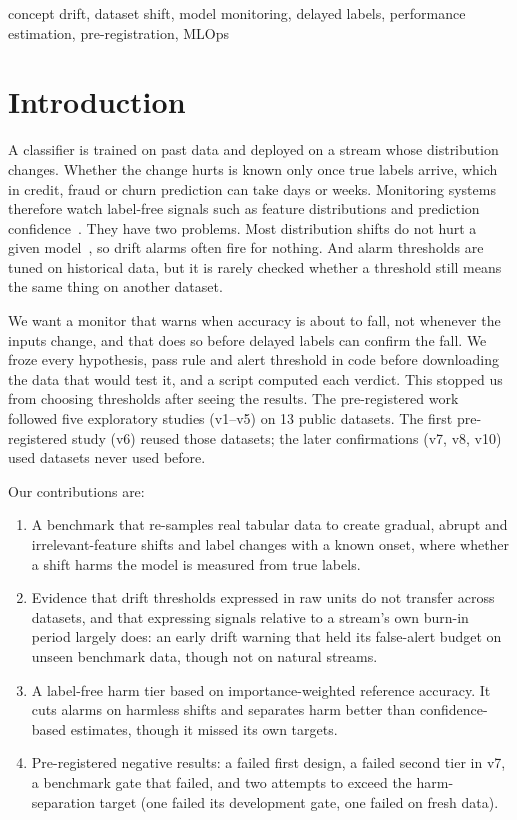 \documentclass[conference]{IEEEtran}
\begin{document}
\begin{IEEEkeywords}
concept drift, dataset shift, model monitoring, delayed labels, performance estimation, pre-registration, MLOps
\end{IEEEkeywords}

\section{Introduction}
A classifier is trained on past data and deployed on a stream whose distribution changes. Whether the change hurts is known only once true labels arrive, which in credit, fraud or churn prediction can take days or weeks. Monitoring systems therefore watch label-free signals such as feature distributions and prediction confidence~\cite{sculley2015debt,breck2017mltest}. They have two problems. Most distribution shifts do not hurt a given model~\cite{rabanser2019failing}, so drift alarms often fire for nothing. And alarm thresholds are tuned on historical data, but it is rarely checked whether a threshold still means the same thing on another dataset.

We want a monitor that warns when accuracy is about to fall, not whenever the inputs change, and that does so before delayed labels can confirm the fall. We froze every hypothesis, pass rule and alert threshold in code before downloading the data that would test it, and a script computed each verdict. This stopped us from choosing thresholds after seeing the results. The pre-registered work followed five exploratory studies (v1--v5) on 13 public datasets. The first pre-registered study (v6) reused those datasets; the later confirmations (v7, v8, v10) used datasets never used before.

Our contributions are:
\begin{enumerate}
\item A benchmark that re-samples real tabular data to create gradual, abrupt and irrelevant-feature shifts and label changes with a known onset, where whether a shift harms the model is measured from true labels.
\item Evidence that drift thresholds expressed in raw units do not transfer across datasets, and that expressing signals relative to a stream's own burn-in period largely does: an early drift warning that held its false-alert budget on unseen benchmark data, though not on natural streams.
\item A label-free harm tier based on importance-weighted reference accuracy. It cuts alarms on harmless shifts and separates harm better than confidence-based estimates, though it missed its own targets.
\item Pre-registered negative results: a failed first design, a failed second tier in v7, a benchmark gate that failed, and two attempts to exceed the harm-separation target (one failed its development gate, one failed on fresh data).
\end{enumerate}
\end{document}
